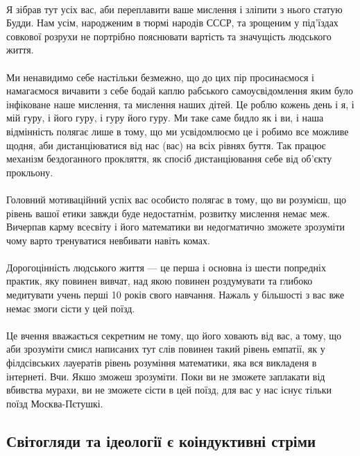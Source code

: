 \\
Я зібрав тут усіх вас, аби переплавити ваше мислення і зліпити з нього статую Будди. Нам усім, народженим
в тюрмі народів СССР, та зрощеним у під'їздах совкової розрухи не портрібно пояснювати вартість
та значущість людського життя.
\\
\\
Ми ненавидимо себе настільки безмежно, що до цих пір просинаємося і намагаємося вичавити з себе
бодай каплю рабського самоусвідомлення яким було інфіковане наше мислення, та мислення наших дітей.
Це роблю кожень день і я, і мій гуру, і його гуру, і гуру його гуру. Ми таке саме бидло як і ви,
і наша відмінність полягає лише в тому, що ми усвідомлюємо це і робимо все можливе щодня, аби
дистанціюватися від нас (вас) на всіх рівнях буття. Так працює механізм бездоганного прокляття, як
спосіб дистанціювання себе від об'єкту прокльону.
\\
\\
Головний мотиваційний успіх вас особисто полягає в тому, що ви розумієш, що рівень вашої етики
завжди буде недостатнім, розвитку мислення немає меж. Вичерпав карму всесвіту і його математики
ви недогматично зможете зрозуміти чому варто тренуватися невбивати навіть комах.
\\
\\
Дорогоцінність людського життя --- це перша і основна із шести попредніх практик, яку
повинен вивчат, над якою повинен роздумувати та глибоко медитувати учень перші 10 років свого навчання.
Нажаль у більшості з вас вже немає змоги сісти у цей поїзд.
\\
\\
Це вчення вважається секретним не тому, що його ховають від вас, а тому, що аби зрозуміти
смисл написаних тут слів повинен такий рівень емпатії, як у філдсівських лауератів рівень розуміння математики,
яка вся викладеня в інтернеті. Вчи. Якшо зможеш зрозуміти.
Поки ви не зможете заплакати від вбивства мурахи, ви не зможете сісти в цей поїзд,
для вас у нас існує тільки поїзд Москва-Пєтушкі.

\subsection{Світогляди та ідеології є коіндуктивні стріми}

